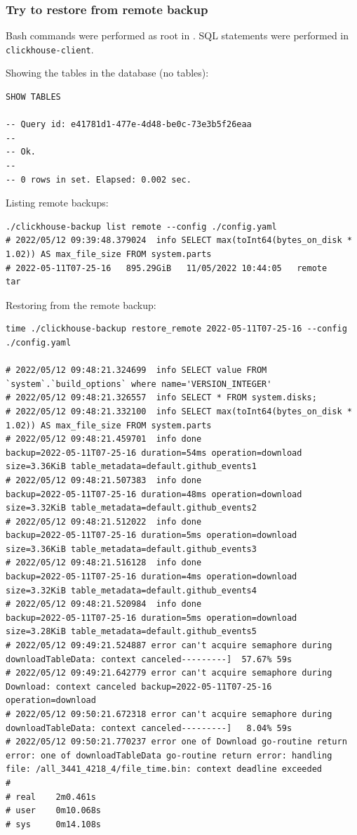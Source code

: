 \subsubsection{Try to restore from remote backup}
\label{sec:org5cb0fa6}
Bash commands were performed as root in .
SQL statements were performed in \texttt{clickhouse-client}.

Showing the tables in the database (no tables):
\begin{verbatim}
SHOW TABLES

-- Query id: e41781d1-477e-4d48-be0c-73e3b5f26eaa
--
-- Ok.
--
-- 0 rows in set. Elapsed: 0.002 sec.
\end{verbatim}

Listing remote backups:
\begin{verbatim}
./clickhouse-backup list remote --config ./config.yaml
# 2022/05/12 09:39:48.379024  info SELECT max(toInt64(bytes_on_disk * 1.02)) AS max_file_size FROM system.parts
# 2022-05-11T07-25-16   895.29GiB   11/05/2022 10:44:05   remote      tar
\end{verbatim}

Restoring from the remote backup:
\begin{verbatim}
time ./clickhouse-backup restore_remote 2022-05-11T07-25-16 --config ./config.yaml

# 2022/05/12 09:48:21.324699  info SELECT value FROM `system`.`build_options` where name='VERSION_INTEGER'
# 2022/05/12 09:48:21.326557  info SELECT * FROM system.disks;
# 2022/05/12 09:48:21.332100  info SELECT max(toInt64(bytes_on_disk * 1.02)) AS max_file_size FROM system.parts
# 2022/05/12 09:48:21.459701  info done                      backup=2022-05-11T07-25-16 duration=54ms operation=download size=3.36KiB table_metadata=default.github_events1
# 2022/05/12 09:48:21.507383  info done                      backup=2022-05-11T07-25-16 duration=48ms operation=download size=3.32KiB table_metadata=default.github_events2
# 2022/05/12 09:48:21.512022  info done                      backup=2022-05-11T07-25-16 duration=5ms operation=download size=3.36KiB table_metadata=default.github_events3
# 2022/05/12 09:48:21.516128  info done                      backup=2022-05-11T07-25-16 duration=4ms operation=download size=3.32KiB table_metadata=default.github_events4
# 2022/05/12 09:48:21.520984  info done                      backup=2022-05-11T07-25-16 duration=5ms operation=download size=3.28KiB table_metadata=default.github_events5
# 2022/05/12 09:49:21.524887 error can't acquire semaphore during downloadTableData: context canceled---------]  57.67% 59s
# 2022/05/12 09:49:21.642779 error can't acquire semaphore during Download: context canceled backup=2022-05-11T07-25-16 operation=download
# 2022/05/12 09:50:21.672318 error can't acquire semaphore during downloadTableData: context canceled---------]   8.04% 59s
# 2022/05/12 09:50:21.770237 error one of Download go-routine return error: one of downloadTableData go-routine return error: handling file: /all_3441_4218_4/file_time.bin: context deadline exceeded
#
# real    2m0.461s
# user    0m10.068s
# sys     0m14.108s
\end{verbatim}

